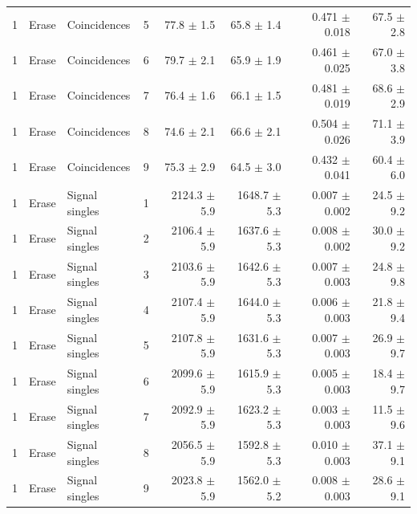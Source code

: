 \begin{tabular}{llllrrrr}
1 & Erase & Coincidences & 5 & 77.8 \ensuremath{\pm} 1.5 & 65.8 \ensuremath{\pm} 1.4 & 0.471 \ensuremath{\pm} 0.018 & 67.5 \ensuremath{\pm} 2.8 \\
1 & Erase & Coincidences & 6 & 79.7 \ensuremath{\pm} 2.1 & 65.9 \ensuremath{\pm} 1.9 & 0.461 \ensuremath{\pm} 0.025 & 67.0 \ensuremath{\pm} 3.8 \\
1 & Erase & Coincidences & 7 & 76.4 \ensuremath{\pm} 1.6 & 66.1 \ensuremath{\pm} 1.5 & 0.481 \ensuremath{\pm} 0.019 & 68.6 \ensuremath{\pm} 2.9 \\
1 & Erase & Coincidences & 8 & 74.6 \ensuremath{\pm} 2.1 & 66.6 \ensuremath{\pm} 2.1 & 0.504 \ensuremath{\pm} 0.026 & 71.1 \ensuremath{\pm} 3.9 \\
1 & Erase & Coincidences & 9 & 75.3 \ensuremath{\pm} 2.9 & 64.5 \ensuremath{\pm} 3.0 & 0.432 \ensuremath{\pm} 0.041 & 60.4 \ensuremath{\pm} 6.0 \\
\midrule
1 & Erase & Signal singles & 1 & 2124.3 \ensuremath{\pm} 5.9 & 1648.7 \ensuremath{\pm} 5.3 & 0.007 \ensuremath{\pm} 0.002 & 24.5 \ensuremath{\pm} 9.2 \\
1 & Erase & Signal singles & 2 & 2106.4 \ensuremath{\pm} 5.9 & 1637.6 \ensuremath{\pm} 5.3 & 0.008 \ensuremath{\pm} 0.002 & 30.0 \ensuremath{\pm} 9.2 \\
1 & Erase & Signal singles & 3 & 2103.6 \ensuremath{\pm} 5.9 & 1642.6 \ensuremath{\pm} 5.3 & 0.007 \ensuremath{\pm} 0.003 & 24.8 \ensuremath{\pm} 9.8 \\
1 & Erase & Signal singles & 4 & 2107.4 \ensuremath{\pm} 5.9 & 1644.0 \ensuremath{\pm} 5.3 & 0.006 \ensuremath{\pm} 0.003 & 21.8 \ensuremath{\pm} 9.4 \\
1 & Erase & Signal singles & 5 & 2107.8 \ensuremath{\pm} 5.9 & 1631.6 \ensuremath{\pm} 5.3 & 0.007 \ensuremath{\pm} 0.003 & 26.9 \ensuremath{\pm} 9.7 \\
1 & Erase & Signal singles & 6 & 2099.6 \ensuremath{\pm} 5.9 & 1615.9 \ensuremath{\pm} 5.3 & 0.005 \ensuremath{\pm} 0.003 & 18.4 \ensuremath{\pm} 9.7 \\
1 & Erase & Signal singles & 7 & 2092.9 \ensuremath{\pm} 5.9 & 1623.2 \ensuremath{\pm} 5.3 & 0.003 \ensuremath{\pm} 0.003 & 11.5 \ensuremath{\pm} 9.6 \\
1 & Erase & Signal singles & 8 & 2056.5 \ensuremath{\pm} 5.9 & 1592.8 \ensuremath{\pm} 5.3 & 0.010 \ensuremath{\pm} 0.003 & 37.1 \ensuremath{\pm} 9.1 \\
1 & Erase & Signal singles & 9 & 2023.8 \ensuremath{\pm} 5.9 & 1562.0 \ensuremath{\pm} 5.2 & 0.008 \ensuremath{\pm} 0.003 & 28.6 \ensuremath{\pm} 9.1 \\
\bottomrule
\end{tabular}

